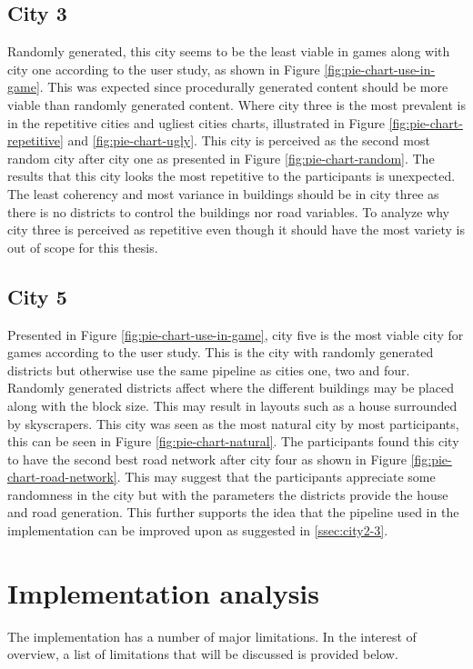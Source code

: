 	\subsection{City 3}
		Randomly generated, this city seems to be the least viable in games along with city one according to the user study, as shown in Figure \ref{fig:pie-chart-use-in-game}. This was expected since procedurally generated content should be more viable than randomly generated content. Where city three is the most prevalent is in the repetitive cities and ugliest cities charts, illustrated in Figure \ref{fig:pie-chart-repetitive} and \ref{fig:pie-chart-ugly}. This city is perceived as the second most random city after city one as presented in Figure \ref{fig:pie-chart-random}. The results that this city looks the most repetitive to the participants is unexpected. The least coherency and most variance in buildings should be in city three as there is no districts to control the buildings nor road variables. To analyze why city three is perceived as repetitive even though it should have the most variety is out of scope for this thesis.
	\subsection{City 5}
		Presented in Figure \ref{fig:pie-chart-use-in-game}, city five is the most viable city for games according to the user study. This is the city with randomly generated districts but otherwise use the same pipeline as cities one, two and four. Randomly generated districts affect where the different buildings may be placed along with the block size. This may result in layouts such as a house surrounded by skyscrapers. This city was seen as the most natural city by most participants, this can be seen in Figure \ref{fig:pie-chart-natural}. The participants found this city to have the second best road network after city four as shown in Figure \ref{fig:pie-chart-road-network}. This may suggest that the participants appreciate some randomness in the city but with the parameters the districts provide the house and road generation. This further supports the idea that the pipeline used in the implementation can be improved upon as suggested in \ref{ssec:city2-3}.
	
\section{Implementation analysis}
The implementation has a number of major limitations. In the interest of overview, a list of limitations that will be discussed is provided below.
	
